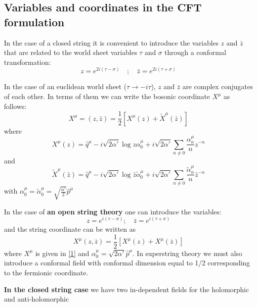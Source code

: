 \subsection{Variables and coordinates in the CFT formulation}
In the case of a closed string it is convenient to
introduce the variables $z$ and $\bar{z}$ that are related to the world sheet variables
$\tau$ and $\sigma$ through a conformal transformation:
\begin{equation}
 z=e^{2i(\tau-\sigma)}\quad;\quad \bar{z} = e^{2i(\tau + \sigma)}
\end{equation}
\par In the case of an euclidean world sheet ($\tau \rightarrow  -i\tau$), $z$
and $\bar{z}$ are complex conjugates of each other. In terms of them we can write the bosonic coordinate $X^\mu$ as follows:
\begin{equation}
X^\mu =\left(z,\bar{z}\right) = \frac{1}{2}\left[X^\mu\left(z\right)+\tilde{X}^\mu\left(\bar{z}\right)\right]
\end{equation}
where
\begin{equation}
X^\mu\left(z\right) = \hat{q}^\mu - i\sqrt{2\alpha'}\log{z}\alpha_0^\mu
+ i\sqrt{2\alpha'}\sum_{n\neq 0}{\frac{\alpha_n^\mu}{n}z^{-n}} 
\label{1} 	
\end{equation}
and 
\begin{equation}
\tilde{X}^\mu\left(\bar{z}\right) = \hat{q}^\mu - i\sqrt{2\alpha'}\log{\bar{z}}\tilde{\alpha}_0^\mu + i\sqrt{2\alpha'}\sum_{n\neq 0}\frac{\tilde{\alpha}_n^\mu}{n}\bar{z}^{-n}  	
\end{equation}
with $\alpha_0^\mu = \tilde{\alpha}_0^\mu = \sqrt{\frac{\alpha'}{2}}\hat{p}^\mu$ 
\par In the case of \textbf{an open string theory} one can
introduce the variables:
\begin{equation}
 z=e^{i(\tau-\sigma)};\quad \bar{z} = e^{i(\tau+\sigma)}
\end{equation}
and the string coordinate can be written as
\begin{equation}
	X^\mu\left(z,\bar{z}\right) = \frac{1}{2}\left[X^\mu\left(z\right)+X^\mu\left(\bar{z}\right)\right]
\end{equation}
where $X^\mu$ is given in \eqref{1} and $\alpha_0^\mu = \sqrt{2\alpha'}\hat{p}^\mu$. In superstring theory
we must also introduce a conformal field with conformal dimension equal
to 1/2 corresponding to the fermionic coordinate. 
\par\textbf{In the closed string case}
we have two in-dependent fields for the holomorphic and anti-holomorphic
